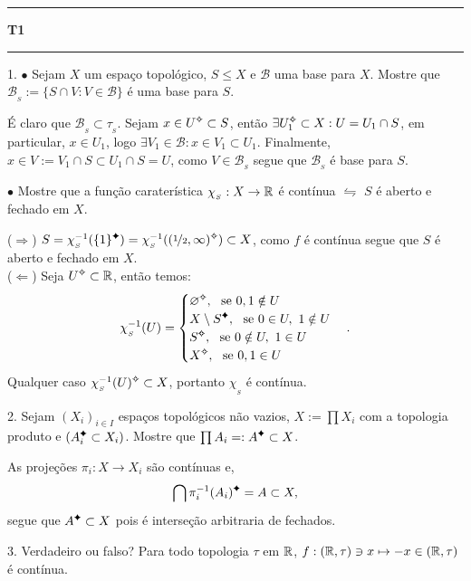 \-\vspace{-0.3cm}
  {\hrule \vspace{-0.15cm}
  \centering \textbf{T1} \vspace{0.1cm}
  \hrule}

1. \(\bullet \) Sejam \(X\) um espaço topológico, \(S\leq X\) e \(\mathcal{B}\) uma base para \(X\). Mostre que \(\mathcal{B}_{_S} := \{S \cap V : V \in \mathcal{B}\}\) é uma base para \(S\).  

\textcolor{gris}{É claro que \(\mathcal{B}_{_S} \subset \tau_{_S}\). Sejam \(x \in U\ab\subset S\), então \(\exists U_1\ab \subset X: U = U_1 \cap S\), em particular, \(x\in U_1\), logo \(\exists V_1 \in \mathcal{B} : x\in V_1 \subset U_1\). Finalmente, \(x \in V := V_1 \cap S \subset U_1 \cap S = U\), como \(V \in \mathcal{B}_{_S}\) segue que \(\mathcal{B}_{_S}\) é base para \(S\). }
 
\(\bullet\) Mostre que a função caraterística \(\chi_{_S}:X \to \mathbb{R}\) é contínua \(\leftrightharpoons\) \(S\) é aberto e fechado em \(X\).  

\textcolor{gris}{(\(\Rightarrow\)) \(S = \chi_{_S}^{-1}(\{1\}\ce)  = \chi_{_S}^{-1} ((\nicefrac{1}{2}, \infty)\ab) \subset X\), como \(f\) é contínua segue que \(S\) é aberto e fechado em \(X\). \\
(\(\Leftarrow\)) Seja \(U\ab \subset \R\), então temos:
\[\chi_{_S}^{-1}(U) = \begin{cases}
\varnothing\ab, \ \ \text{se } 0,1 \notin U \\ 
X\setminus S\ce, \ \ \text{se } 0 \in U, \ 1 \notin U \\ 
S\ab, \ \ \text{se } 0\notin U, \ 1 \in U \\ 
X\ab, \ \ \text{se } 0,1 \in U \\ 
\end{cases}.\]
Qualquer caso \(\chi_{_S}^{-1}(U)\ab \subset X\), portanto \(\chi_{_S}\) é contínua. }   

2. Sejam \((X_i)_{i\in I}\) espaços topológicos não vazios, \(X := \prod X_i\) com a topologia produto e \((A_i\ce\subset X_i)\). Mostre que \(\prod A_i =: A\ce \subset X\).   

\textcolor{gris}{ 
As projeções \(\pi_i : X \to X_i\) são contínuas e, 
\[\bigcap \pi_i^{-1}(A_i)\ce = A \subset X, \]
segue que \(A\ce\subset X\) pois é interseção arbitraria de fechados.} 

3. Verdadeiro ou falso? Para todo topologia \(\tau\) em \(\mathbb{R}\), \(f : (\mathbb{R}, \tau) \ni x \mapsto -x \in (\mathbb{R}, \tau)\) é contínua.   

